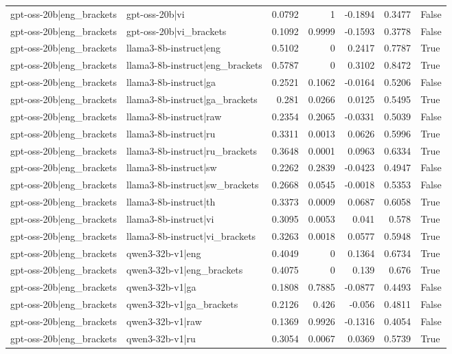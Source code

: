\begin{table}
\begin{tabular}{l l r r r r l}
gpt-oss-20b|eng_brackets & gpt-oss-20b|vi & 0.0792 & 1 & -0.1894 & 0.3477 & False \\
gpt-oss-20b|eng_brackets & gpt-oss-20b|vi_brackets & 0.1092 & 0.9999 & -0.1593 & 0.3778 & False \\
gpt-oss-20b|eng_brackets & llama3-8b-instruct|eng & 0.5102 & 0 & 0.2417 & 0.7787 & True \\
gpt-oss-20b|eng_brackets & llama3-8b-instruct|eng_brackets & 0.5787 & 0 & 0.3102 & 0.8472 & True \\
gpt-oss-20b|eng_brackets & llama3-8b-instruct|ga & 0.2521 & 0.1062 & -0.0164 & 0.5206 & False \\
gpt-oss-20b|eng_brackets & llama3-8b-instruct|ga_brackets & 0.281 & 0.0266 & 0.0125 & 0.5495 & True \\
gpt-oss-20b|eng_brackets & llama3-8b-instruct|raw & 0.2354 & 0.2065 & -0.0331 & 0.5039 & False \\
gpt-oss-20b|eng_brackets & llama3-8b-instruct|ru & 0.3311 & 0.0013 & 0.0626 & 0.5996 & True \\
gpt-oss-20b|eng_brackets & llama3-8b-instruct|ru_brackets & 0.3648 & 0.0001 & 0.0963 & 0.6334 & True \\
gpt-oss-20b|eng_brackets & llama3-8b-instruct|sw & 0.2262 & 0.2839 & -0.0423 & 0.4947 & False \\
gpt-oss-20b|eng_brackets & llama3-8b-instruct|sw_brackets & 0.2668 & 0.0545 & -0.0018 & 0.5353 & False \\
gpt-oss-20b|eng_brackets & llama3-8b-instruct|th & 0.3373 & 0.0009 & 0.0687 & 0.6058 & True \\
gpt-oss-20b|eng_brackets & llama3-8b-instruct|vi & 0.3095 & 0.0053 & 0.041 & 0.578 & True \\
gpt-oss-20b|eng_brackets & llama3-8b-instruct|vi_brackets & 0.3263 & 0.0018 & 0.0577 & 0.5948 & True \\
gpt-oss-20b|eng_brackets & qwen3-32b-v1|eng & 0.4049 & 0 & 0.1364 & 0.6734 & True \\
gpt-oss-20b|eng_brackets & qwen3-32b-v1|eng_brackets & 0.4075 & 0 & 0.139 & 0.676 & True \\
gpt-oss-20b|eng_brackets & qwen3-32b-v1|ga & 0.1808 & 0.7885 & -0.0877 & 0.4493 & False \\
gpt-oss-20b|eng_brackets & qwen3-32b-v1|ga_brackets & 0.2126 & 0.426 & -0.056 & 0.4811 & False \\
gpt-oss-20b|eng_brackets & qwen3-32b-v1|raw & 0.1369 & 0.9926 & -0.1316 & 0.4054 & False \\
gpt-oss-20b|eng_brackets & qwen3-32b-v1|ru & 0.3054 & 0.0067 & 0.0369 & 0.5739 & True \\

\end{tabular}
\end{table}
